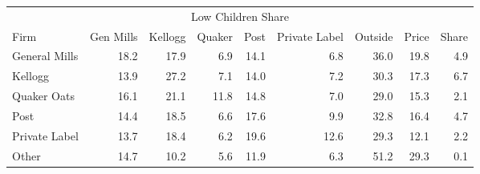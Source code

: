 \begin{tabular}{lrrrrrrrr}
\toprule
\multicolumn{9}{c}{Low Children Share}\\
          Firm &  Gen Mills &  Kellogg &  Quaker &  Post &  Private Label &  Outside &  Price &  Share \\
\midrule
 General Mills &       18.2 &     17.9 &     6.9 &  14.1 &            6.8 &     36.0 &   19.8 &    4.9 \\
       Kellogg &       13.9 &     27.2 &     7.1 &  14.0 &            7.2 &     30.3 &   17.3 &    6.7 \\
   Quaker Oats &       16.1 &     21.1 &    11.8 &  14.8 &            7.0 &     29.0 &   15.3 &    2.1 \\
          Post &       14.4 &     18.5 &     6.6 &  17.6 &            9.9 &     32.8 &   16.4 &    4.7 \\
 Private Label &       13.7 &     18.4 &     6.2 &  19.6 &           12.6 &     29.3 &   12.1 &    2.2 \\
         Other &       14.7 &     10.2 &     5.6 &  11.9 &            6.3 &     51.2 &   29.3 &    0.1 \\
\bottomrule
\end{tabular}
